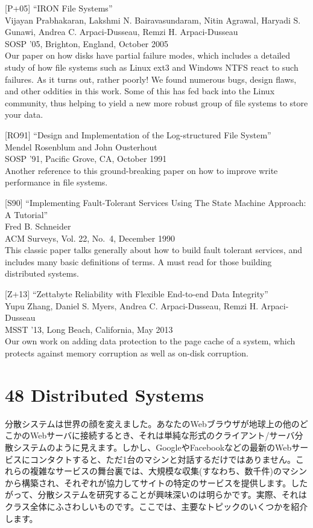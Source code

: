 {[}P+05{]} ``IRON File Systems''\\
Vijayan Prabhakaran, Lakshmi N. Bairavasundaram, Nitin Agrawal, Haryadi
S. Gunawi, Andrea C. Arpaci-Dusseau, Remzi H. Arpaci-Dusseau\\
SOSP '05, Brighton, England, October 2005\\
Our paper on how disks have partial failure modes, which includes a
detailed study of how file systems such as Linux ext3 and Windows NTFS
react to such failures. As it turns out, rather poorly! We found
numerous bugs, design flaws, and other oddities in this work. Some of
this has fed back into the Linux community, thus helping to yield a new
more robust group of file systems to store your data.

{[}RO91{]} ``Design and Implementation of the Log-structured File
System''\\
Mendel Rosenblum and John Ousterhout\\
SOSP '91, Pacific Grove, CA, October 1991\\
Another reference to this ground-breaking paper on how to improve write
performance in file systems.

{[}S90{]} ``Implementing Fault-Tolerant Services Using The State Machine
Approach: A Tutorial''\\
Fred B. Schneider\\
ACM Surveys, Vol. 22, No.~4, December 1990\\
This classic paper talks generally about how to build fault tolerant
services, and includes many basic definitions of terms. A must read for
those building distributed systems.

{[}Z+13{]} ``Zettabyte Reliability with Flexible End-to-end Data
Integrity''\\
Yupu Zhang, Daniel S. Myers, Andrea C. Arpaci-Dusseau, Remzi H.
Arpaci-Dusseau\\
MSST '13, Long Beach, California, May 2013\\
Our own work on adding data protection to the page cache of a system,
which protects against memory corruption as well as on-disk corruption.

\hypertarget{distributed-systems}{%
\section*{48 Distributed Systems}\label{distributed-systems}}

分散システムは世界の顔を変えました。あなたのWebブラウザが地球上の他のどこかのWebサーバに接続するとき、それは単純な形式のクライアント/サーバ分散システムのように見えます。しかし、GoogleやFacebookなどの最新のWebサービスにコンタクトすると、ただ1台のマシンと対話するだけではありません。これらの複雑なサービスの舞台裏では、大規模な収集(すなわち、数千件)のマシンから構築され、それぞれが協力してサイトの特定のサービスを提供します。したがって、分散システムを研究することが興味深いのは明らかです。実際、それはクラス全体にふさわしいものです。ここでは、主要なトピックのいくつかを紹介します。

